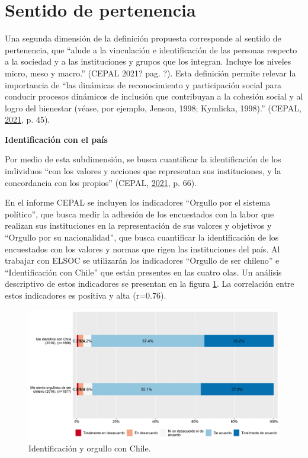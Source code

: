 \documentclass[
  12pt,
]{book}
\begin{document}
\hypertarget{sentido-de-pertenencia}{%
\section{Sentido de pertenencia}\label{sentido-de-pertenencia}}

Una segunda dimensión de la definición propuesta corresponde al sentido de pertenencia, que ``alude a la vinculación e identificación de las personas respecto a la sociedad y a las instituciones y grupos que los integran. Incluye los niveles micro, meso y macro.'' (CEPAL 2021? pag. ?). Esta definición permite relevar la importancia de ``las dinámicas de reconocimiento y participación social para conducir procesos dinámicos de inclusión que contribuyan a la cohesión social y al logro del bienestar (véase, por ejemplo, Jenson, 1998; Kymlicka, 1998).'' (CEPAL, \protect\hyperlink{ref-cepal_Cohesion_2021}{2021}, p. 45).

\textbf{Identificación con el país}

Por medio de esta subdimensión, se busca cuantificar la identificación de los individuos ``con los valores y acciones que representan sus instituciones, y la concordancia con los propios'' (CEPAL, \protect\hyperlink{ref-cepal_Cohesion_2021}{2021}, p. 66).

En el informe CEPAL se incluyen los indicadores ``Orgullo por el sistema político'', que busca medir la adhesión de los encuestados con la labor que realizan sus instituciones en la representación de sus valores y objetivos y ``Orgullo por su nacionalidad'', que busca cuantificar la identificación de los encuestados con los valores y normas que rigen las instituciones del país. Al trabajar con ELSOC se utilizarán los indicadores ``Orgullo de ser chileno'' e ``Identificación con Chile'' que están presentes en las cuatro olas. Un análisis descriptivo de estos indicadores se presentan en la figura \ref{fig:identificacion}. La correlación entre estos indicadores es positiva y alta (r=0.76).

\begin{figure}[H]

{\centering \includegraphics[width=1\linewidth,height=1\textheight]{output/graphs/identificacion} 

}

\caption{Identificación y orgullo con Chile.}\label{fig:identificacion}
\end{figure}
\end{document}
